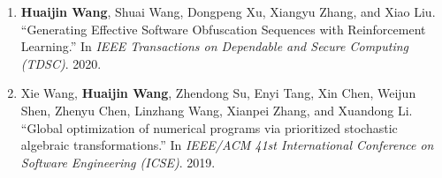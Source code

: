 \begin{enumerate}
    \item \textbf{Huaijin Wang}, Shuai Wang, Dongpeng Xu, Xiangyu Zhang, and Xiao Liu.
    ``Generating Effective Software Obfuscation Sequences with Reinforcement Learning.''
    In \textit{IEEE Transactions on Dependable and Secure Computing (TDSC)}. 2020.
    
    \item Xie Wang, \textbf{Huaijin Wang}, Zhendong Su, Enyi Tang, Xin Chen, Weijun Shen, Zhenyu Chen, Linzhang Wang, Xianpei Zhang, and Xuandong Li.
    ``Global optimization of numerical programs via prioritized stochastic algebraic transformations.''
    In \textit{IEEE/ACM 41st
    International Conference on Software Engineering (ICSE)}. 2019.
\end{enumerate}